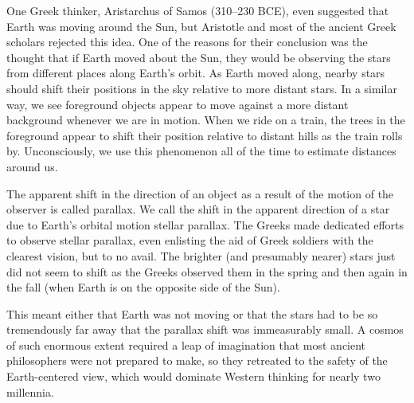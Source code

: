 \documentclass[../../main-astronomy.tex]{subfiles}
\begin{document}
\vspace{1em}

One Greek thinker, Aristarchus of Samos (310--230 BCE), even suggested that Earth was moving around the Sun, but Aristotle and most of the ancient Greek scholars rejected this idea. One of the reasons for their conclusion was the thought that if Earth moved about the Sun, they would be observing the stars from different places along Earth's orbit. As Earth moved along, nearby stars should shift their positions in the sky relative to more distant stars. In a similar way, we see foreground objects appear to move against a more distant background whenever we are in motion. When we ride on a train, the trees in the foreground appear to shift their position relative to distant hills as the train rolls by. Unconsciously, we use this phenomenon all of the time to estimate distances around us.

\vspace{1em}

The apparent shift in the direction of an object as a result of the motion of the observer is called \gls{parallax}. We call the shift in the apparent direction of a star due to Earth's orbital motion stellar parallax. The Greeks made dedicated efforts to observe stellar parallax, even enlisting the aid of Greek soldiers with the clearest vision, but to no avail. The brighter (and presumably nearer) stars just did not seem to shift as the Greeks observed them in the spring and then again in the fall (when Earth is on the opposite side of the Sun).

\vspace{1em}

This meant either that Earth was not moving or that the stars had to be so tremendously far away that the parallax shift was immeasurably small. A cosmos of such enormous extent required a leap of imagination that most ancient philosophers were not prepared to make, so they retreated to the safety of the Earth-centered view, which would dominate Western thinking for nearly two millennia.
\end{document}
